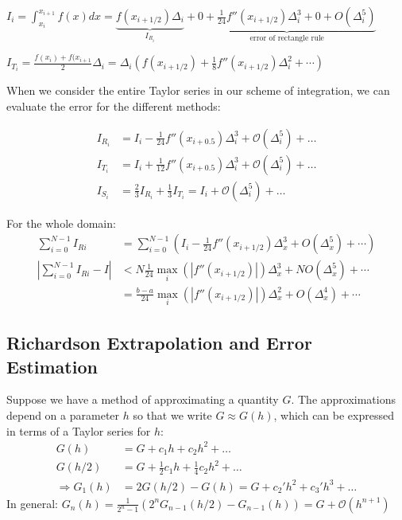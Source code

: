 \documentclass[8pt,a4paper]{scrartcl}
\begin{document}
\begin{multicols*}{3}
$I_i=\int_{x_i}^{x_{i+1}}f(x)dx=\underbrace{f(x_{i+1/2})\Delta_i}_{I_{R_i}}+\underbrace{0+\frac{1}{24}f''(x_{i+1/2})\Delta_i^3+0+O(\Delta_i^5)}_{\text{error of rectangle rule}}$

$I_{T_i}=\frac{f(x_i)+f(x_{i+1}}{2}\Delta_i=\Delta_i\left(f(x_{i+1/2})+\frac{1}{8}f''(x_{i+1/2})\Delta_i^2+\cdots\right)$

\finn

When we consider the entire Taylor series in our scheme of integration, we can evaluate the error for the different methods:

\small
\begin{align*}
I_{R_i} &= I_i - \frac{1}{24} f''(x_{i+0.5}) \Delta_i^3 + \mathcal{O}(\Delta_i^5) + \dots \\
I_{T_i} &= I_i + \frac{1}{12} f''(x_{i+0.5}) \Delta_i^3 + \mathcal{O}(\Delta_i^5) + \dots \\
I_{S_i} &= \frac{2}{3} I_{R_i} + \frac{1}{3} I_{T_i} = I_i + \mathcal{O}(\Delta_i^5) + \dots
\end{align*}
\normalsize

For the whole domain:\hfill {}
\begin{align*}
\sum\limits_{i=0}^{N-1}I_{Ri}&=\sum\limits_{i=0}^{N-1}\left(I_i-\frac{1}{24}f''(x_{i+1/2})\Delta_x^3+O(\Delta_x^5)+\cdots\right)\\
\left|\sum\limits_{i=0}^{N-1}I_{Ri}-I\right|&<N\frac{1}{24}\underset{i}{\max}\left(|f''(x_{i+1/2})|\right)\Delta_x^3+NO(\Delta_x^5)+\cdots\\
&=\frac{b-a}{24}\underset{i}{\max}\left(|f''(x_{i+1/2})|\right)\Delta_x^2+O(\Delta_x^4)+\cdots
\end{align*}


\subsection{Richardson Extrapolation and Error Estimation}

Suppose we have a method of approximating a quantity $G$. The approximations depend on a parameter $h$ so that we write $G \approx G(h)$, which can be expressed in terms of a Taylor series for $h$:
\begin{align*}
G(h) &= G + c_1 h + c_2 h^2 + \dots\\
G(h/2) &= G + \frac{1}{2} c_1 h + \frac{1}{4} c_2 h^2 + \dots \\
\Rightarrow G_1(h) &= 2 G(h/2) - G(h) = G + c_2' h^2 + c_3' h^3 + \dots
\end{align*}
In general: $G_n(h) = \frac{1}{2^n -1} \left( 2^n G_{n-1}(h/2) - G_{n-1}(h) \right) = G + \mathcal{O}(h^{n+1})$


\end{multicols*}
\end{document}
